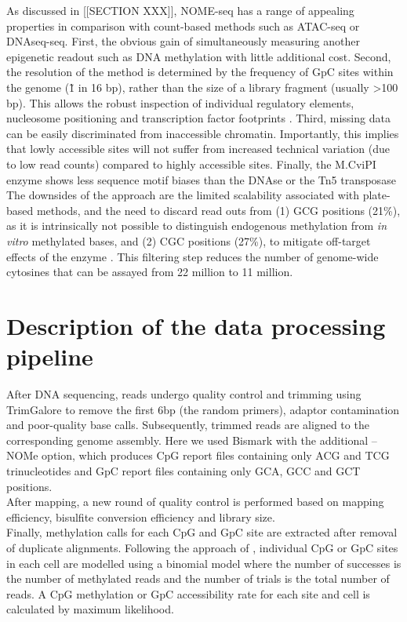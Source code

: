 As discussed in [[SECTION XXX]], NOME-seq has a range of appealing properties in comparison with count-based methods such as ATAC-seq or DNAseq-seq. First, the obvious gain of simultaneously measuring another epigenetic readout such as DNA methylation with little additional cost. Second, the resolution of the method is determined by the frequency of GpC sites within the genome (\~1 in 16 bp), rather than the size of a library fragment (usually >100 bp). This allows the robust inspection of individual regulatory elements, nucleosome positioning and transcription factor footprints \cite{Kelly2012,Pott2016,Nordstrom2019}. Third, missing data can be easily discriminated from inaccessible chromatin. Importantly, this implies that lowly accessible sites will not suffer from increased technical variation (due to low read counts) compared to highly accessible sites. Finally, the M.CviPI enzyme shows less sequence motif biases than the DNAse or the Tn5 transposase \cite{Nordstrom2019}\\ 

The downsides of the approach are the limited scalability associated with plate-based methods, and the need to discard read outs from (1) GCG positions (21\%), as it is intrinsically not possible to distinguish endogenous methylation from \textit{in vitro} methylated bases, and (2) CGC positions (27\%), to mitigate off-target effects of the enzyme \cite{Kelly2012}. This filtering step reduces the number of genome-wide cytosines that can be assayed from 22 million to 11 million. 


\section{Description of the data processing pipeline}
After DNA sequencing, reads undergo quality control and trimming using TrimGalore to remove the first 6bp (the random primers), adaptor contamination and poor-quality base calls. Subsequently, trimmed reads are aligned to the corresponding genome assembly. Here we used Bismark \cite{Krueger2011} with the additional --NOMe option, which produces CpG report files containing only ACG and TCG trinucleotides and GpC report files containing only GCA, GCC and GCT positions.\\
After mapping, a new round of quality control is performed based on mapping efficiency, bisulfite conversion efficiency and library size.\\
Finally, methylation calls for each CpG and GpC site are extracted after removal of duplicate alignments. Following the approach of \cite{Smallwood2014}, individual CpG or GpC sites in each cell are modelled using a binomial model where the number of successes is the number of methylated reads and the number of trials is the total number of reads. A CpG methylation or GpC accessibility rate for each site and cell is calculated by maximum likelihood.\\

